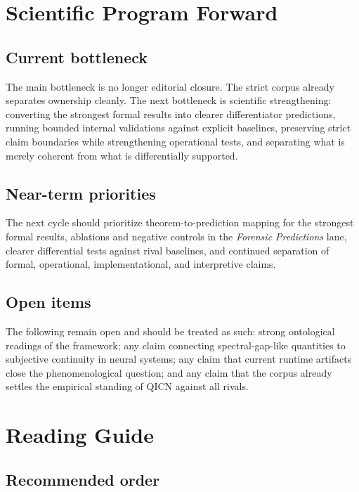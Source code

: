 \documentclass[11pt,a4paper]{article}
\begin{document}
\section{Scientific Program Forward}

\subsection{Current bottleneck}

The main bottleneck is no longer editorial closure. The strict corpus already separates ownership cleanly. The next bottleneck is scientific strengthening: converting the strongest formal results into clearer differentiator predictions, running bounded internal validations against explicit baselines, preserving strict claim boundaries while strengthening operational tests, and separating what is merely coherent from what is differentially supported.

\subsection{Near-term priorities}

The next cycle should prioritize theorem-to-prediction mapping for the strongest formal results, ablations and negative controls in the \textit{Forensic Predictions} lane, clearer differential tests against rival baselines, and continued separation of formal, operational, implementational, and interpretive claims.

\subsection{Open items}

The following remain open and should be treated as such: strong ontological readings of the framework; any claim connecting spectral-gap-like quantities to subjective continuity in neural systems; any claim that current runtime artifacts close the phenomenological question; and any claim that the corpus already settles the empirical standing of QICN against all rivals.

\section{Reading Guide}

\subsection{Recommended order}
\end{document}
